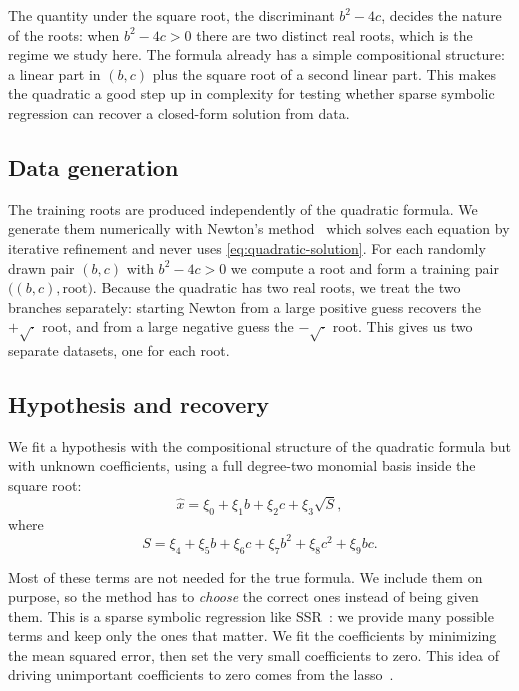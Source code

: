 \documentclass[11pt]{article}
\theoremstyle{plain}
\theoremstyle{definition}
\begin{document}
The quantity under the square root, the discriminant $b^2 - 4c$, decides
the nature of the roots: when $b^2 - 4c > 0$ there are two distinct real
roots, which is the regime we study here. The formula already has a simple
compositional structure: a linear part in $(b, c)$ plus the square root of
a second linear part. This makes the quadratic a good step up in complexity for testing whether sparse symbolic regression can recover a closed-form solution from data.
 
\subsection*{Data generation}
 
The training roots are produced independently of the quadratic formula. We generate them numerically with Newton's method~\cite{suli2003numerical} which solves each equation by iterative
refinement and never uses \cref{eq:quadratic-solution}. For each randomly
drawn pair $(b, c)$ with $b^2 - 4c > 0$ we compute a root and form a training pair $\big((b, c), \text{root}\big)$. Because the quadratic has
two real roots, we treat the two branches separately: starting Newton from
a large positive guess recovers the $+\sqrt{\cdot}$ root, and from a large
negative guess the $-\sqrt{\cdot}$ root. This gives us two separate datasets, one for each root.
 
\subsection*{Hypothesis and recovery}
 
We fit a hypothesis with the compositional structure of the quadratic
formula but with unknown coefficients, using a full degree-two monomial
basis inside the square root:
\begin{equation}
\label{eq:quad-hypothesis}
\hat{x} = \xi_0 + \xi_1 b + \xi_2 c + \xi_3 \sqrt{S},
\end{equation}
where
\begin{equation}
S = \xi_4 + \xi_5 b + \xi_6 c + \xi_7 b^2 + \xi_8 c^2 + \xi_9 bc.
\end{equation}

Most of these terms are not needed for the true formula. We include them
on purpose, so the method has to \emph{choose} the correct ones instead of
being given them. This is a sparse symbolic regression like
SSR~\cite{brunton2016sindy}: we provide many possible terms and keep only
the ones that matter. We fit the coefficients by minimizing the mean
squared error, then set the very small coefficients to zero. This idea of
driving unimportant coefficients to zero comes from the lasso~\cite{tibshirani1996lasso}. 
\end{document}
